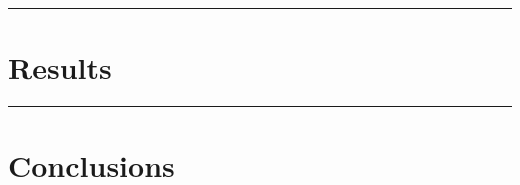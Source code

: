\documentclass[a0,portrait]{a0poster}
\begin{document}
\begin{multicols}{2}
\vspace{5cm}


\hrule


\section*{Results}



\hrule


\section*{Conclusions}


\color{DarkSlateGray}
\tiny



\end{multicols}
\end{document}
